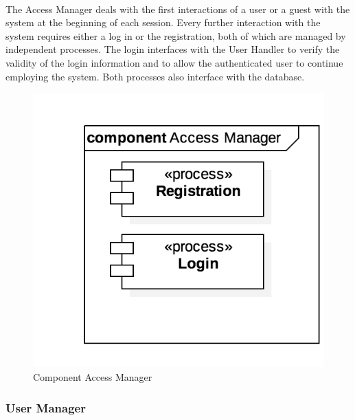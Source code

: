 		
			
			
		\paragraph{}The Access Manager deals with the first interactions of a user or a guest with the system at the beginning of each session. Every further interaction with the system requires either a log in or the registration, both of which are managed by independent processes. The login interfaces with the User Handler to verify the validity of the login information and to allow the authenticated user to continue employing the system. Both processes also interface with the database.

		\begin{figure}[h]
				\includegraphics[scale=0.4, center]{img/component_diagrams/02_access_manager.png}
				\caption{Component Access Manager}
			\end{figure}
		
\FloatBarrier		
		
		\subsubsection*{User Manager}
		
		
		
		
